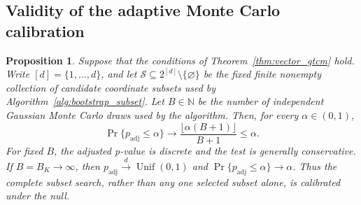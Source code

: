 \documentclass[12pt]{article}
\newtheorem{proposition}[theorem]{Proposition}
\numberwithin{equation}{section}
\begin{document}
\subsection{Validity of the adaptive Monte Carlo calibration}

{
\begin{proposition}
\label{prop:adaptive_calibration}
Suppose that the conditions of Theorem~\ref{thm:vector_gtcm} hold. Write
$[d]=\{1,\ldots,d\}$, and let
$\mathcal S\subseteq 2^{[d]}\setminus\{\varnothing\}$ be the fixed finite
nonempty collection of candidate coordinate subsets used by
Algorithm~\ref{alg:bootstrap_subset}. Let $B\in\mathbb N$ be the number of
independent Gaussian Monte Carlo draws used by the algorithm. Then, for
every $\alpha\in(0,1)$,
\begin{equation}
\label{eq:adaptive_size_control}
\Pr\{p_{\mathrm{adj}}\leq\alpha\}
\longrightarrow
\frac{\lfloor\alpha(B+1)\rfloor}{B+1}
\leq\alpha.
\end{equation}
For fixed \(B\), the adjusted p-value is discrete and the test is generally
conservative. If \(B=B_K\to\infty\), then
\(p_{\mathrm{adj}}\xrightarrow{d}\operatorname{Unif}(0,1)\) and
$\Pr\{p_{\mathrm{adj}}\leq\alpha\}\to\alpha$. Thus the complete subset
search, rather than any one selected subset alone, is calibrated under the
null.
\end{proposition}}
\end{document}
